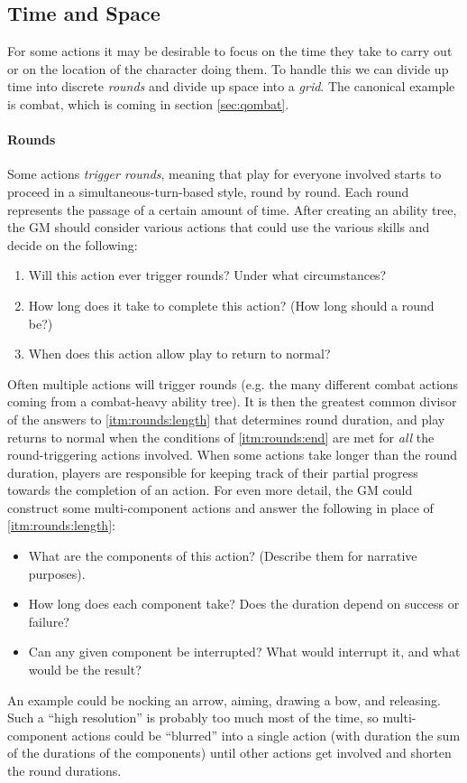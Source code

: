 \documentclass[12pt]{article}
\begin{document}
\subsection{Time and Space}

For some actions it may be desirable to focus on the time they take to carry out
or on the location of the character doing them.
To handle this we can divide up time into discrete \emph{rounds} and divide up space into a \emph{grid}.
The canonical example is combat, which is coming in section \ref{sec:qombat}.

\paragraph{Rounds}
Some actions \emph{trigger rounds},
meaning that play for everyone involved starts to proceed in a simultaneous-turn-based style,
round by round.
Each round represents the passage of a certain amount of time.
After creating an ability tree, the GM should consider various actions
that could use the various skills and decide on the following:
\vspace{-1em}
\begin{enumerate}
\item\label{itm:rounds:trigger}
Will this action ever trigger rounds? Under what circumstances?
\item\label{itm:rounds:length}
How long does it take to complete this action? (How long should a round be?)
\item\label{itm:rounds:end}
When does this action allow play to return to normal?
\end{enumerate}
Often multiple actions will trigger rounds 
(e.g. the many different combat actions coming from a combat-heavy ability tree).
It is then the greatest common divisor of the answers to \ref{itm:rounds:length} that determines round duration,
and play returns to normal when the conditions of \ref{itm:rounds:end} are met for \emph{all} the round-triggering actions involved.
When some actions take longer than the round duration, players are responsible for keeping track of their partial progress towards
the completion of an action.
For even more detail, the GM could construct some multi-component actions and answer the following in place of \ref{itm:rounds:length}:
\vspace{-1em}
\begin{itemize}
\item What are the components of this action? (Describe them for narrative purposes).
\item How long does each component take? Does the duration depend on success or failure?
\item Can any given component be interrupted? What would interrupt it, and what would be the result?
\end{itemize}
An example could be nocking an arrow, aiming, drawing a bow, and releasing.
Such a ``high resolution'' is probably too much most of the time, so multi-component actions could be ``blurred'' into a single
action (with duration the sum of the durations of the components) until other actions get involved and shorten the round durations.
\end{document}
